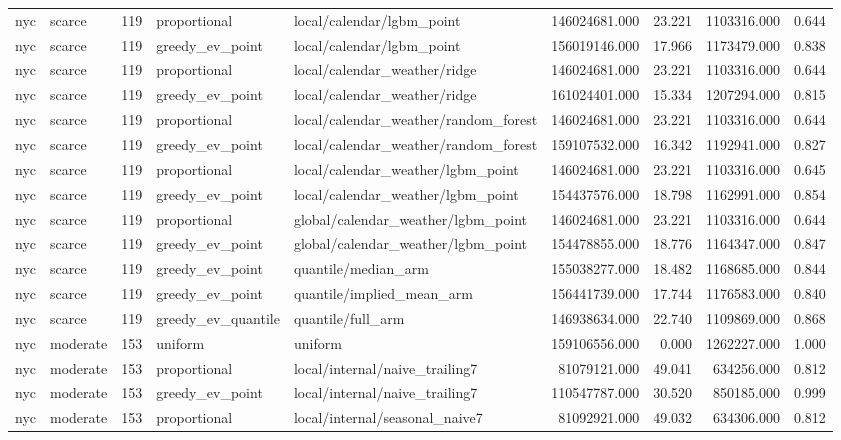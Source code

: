 \begin{tabular}{llrllrrrr}
nyc & scarce & 119 & proportional & local/calendar/lgbm\_point & 146024681.000 & 23.221 & 1103316.000 & 0.644 \\
nyc & scarce & 119 & greedy\_ev\_point & local/calendar/lgbm\_point & 156019146.000 & 17.966 & 1173479.000 & 0.838 \\
nyc & scarce & 119 & proportional & local/calendar\_weather/ridge & 146024681.000 & 23.221 & 1103316.000 & 0.644 \\
nyc & scarce & 119 & greedy\_ev\_point & local/calendar\_weather/ridge & 161024401.000 & 15.334 & 1207294.000 & 0.815 \\
nyc & scarce & 119 & proportional & local/calendar\_weather/random\_forest & 146024681.000 & 23.221 & 1103316.000 & 0.644 \\
nyc & scarce & 119 & greedy\_ev\_point & local/calendar\_weather/random\_forest & 159107532.000 & 16.342 & 1192941.000 & 0.827 \\
nyc & scarce & 119 & proportional & local/calendar\_weather/lgbm\_point & 146024681.000 & 23.221 & 1103316.000 & 0.645 \\
nyc & scarce & 119 & greedy\_ev\_point & local/calendar\_weather/lgbm\_point & 154437576.000 & 18.798 & 1162991.000 & 0.854 \\
nyc & scarce & 119 & proportional & global/calendar\_weather/lgbm\_point & 146024681.000 & 23.221 & 1103316.000 & 0.644 \\
nyc & scarce & 119 & greedy\_ev\_point & global/calendar\_weather/lgbm\_point & 154478855.000 & 18.776 & 1164347.000 & 0.847 \\
nyc & scarce & 119 & greedy\_ev\_point & quantile/median\_arm & 155038277.000 & 18.482 & 1168685.000 & 0.844 \\
nyc & scarce & 119 & greedy\_ev\_point & quantile/implied\_mean\_arm & 156441739.000 & 17.744 & 1176583.000 & 0.840 \\
nyc & scarce & 119 & greedy\_ev\_quantile & quantile/full\_arm & 146938634.000 & 22.740 & 1109869.000 & 0.868 \\
nyc & moderate & 153 & uniform & uniform & 159106556.000 & 0.000 & 1262227.000 & 1.000 \\
nyc & moderate & 153 & proportional & local/internal/naive\_trailing7 & 81079121.000 & 49.041 & 634256.000 & 0.812 \\
nyc & moderate & 153 & greedy\_ev\_point & local/internal/naive\_trailing7 & 110547787.000 & 30.520 & 850185.000 & 0.999 \\
nyc & moderate & 153 & proportional & local/internal/seasonal\_naive7 & 81092921.000 & 49.032 & 634306.000 & 0.812 \\

\end{tabular}
